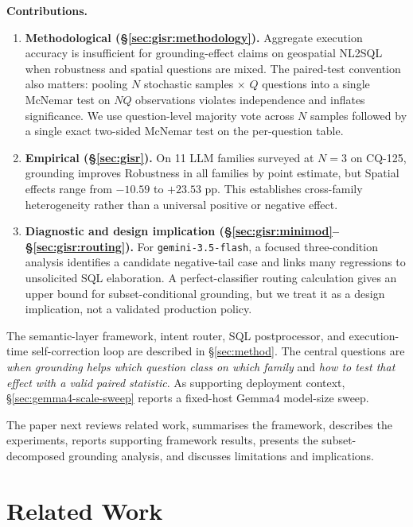 \documentclass[11pt]{article}
\begin{document}
\medskip
\noindent\textbf{Contributions.}
\begin{enumerate}[leftmargin=*]
  \item \textbf{Methodological (\S\ref{sec:gisr:methodology}).} Aggregate execution accuracy is insufficient for grounding-effect claims on geospatial NL2SQL when robustness and spatial questions are mixed. The paired-test convention also matters: pooling $N$ stochastic samples $\times$ $Q$ questions into a single McNemar test on $NQ$ observations violates independence and inflates significance. We use question-level majority vote across $N$ samples followed by a single exact two-sided McNemar test on the per-question table.
  \item \textbf{Empirical (\S\ref{sec:gisr}).} On 11 LLM families surveyed at $N{=}3$ on CQ-125, grounding improves Robustness in all families by point estimate, but Spatial effects range from $-10.59$ to $+23.53$ pp. This establishes cross-family heterogeneity rather than a universal positive or negative effect.
  \item \textbf{Diagnostic and design implication (\S\ref{sec:gisr:minimod}--\S\ref{sec:gisr:routing}).} For \texttt{gemini-3.5-flash}, a focused three-condition analysis identifies a candidate negative-tail case and links many regressions to unsolicited SQL elaboration. A perfect-classifier routing calculation gives an upper bound for subset-conditional grounding, but we treat it as a design implication, not a validated production policy.
\end{enumerate}

The semantic-layer framework, intent router, SQL postprocessor, and execution-time self-correction loop are described in \S\ref{sec:method}. The central questions are \emph{when grounding helps which question class on which family} and \emph{how to test that effect with a valid paired statistic}. As supporting deployment context, \S\ref{sec:gemma4-scale-sweep} reports a fixed-host Gemma4 model-size sweep.

The paper next reviews related work, summarises the framework, describes the experiments, reports supporting framework results, presents the subset-decomposed grounding analysis, and discusses limitations and implications.

\section{Related Work}
\label{sec:related}
\end{document}
